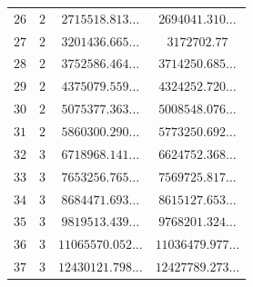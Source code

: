 \documentclass[11pt]{article}
\begin{document}
\begin{table}[htbp]
{\begin{tabular}{|c|c|c|c|}
          $26$  & $2$ & $2715518.813\ldots$ &   $2694041.310\ldots$  \\
          $27$  & $2$ & $3201436.665\ldots$ &   $3172702.77$         \\
          $28$  & $2$ & $3752586.464\ldots$ &   $3714250.685\ldots$  \\
          $29$  & $2$ & $4375079.559\ldots$ &   $4324252.720\ldots$  \\
          $30$  & $2$ & $5075377.363\ldots$ &   $5008548.076\ldots$  \\
          $31$  & $2$ & $5860300.290\ldots$ &   $5773250.692\ldots$  \\
          $32$  & $3$ & $6718968.141\ldots$ &   $6624752.368\ldots$  \\
          $33$  & $3$ & $7653256.765\ldots$ &   $7569725.817\ldots$  \\
          $34$  & $3$ & $8684471.693\ldots$ &   $8615127.653\ldots$  \\
          $35$  & $3$ & $9819513.439\ldots$ &   $9768201.324\ldots$  \\
          $36$  & $3$ & $11065570.052\ldots$ &  $11036479.977\ldots$ \\
          $37$  & $3$ & $12430121.798\ldots$ &  $12427789.273\ldots$ \\
          \hline
      \end{tabular}
}
\end{table}
\end{document}
